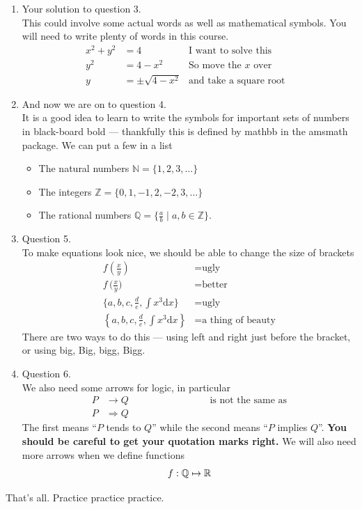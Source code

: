\documentclass[letterpaper,12pt]{article}
\begin{document}
\begin{enumerate}
 \item Your solution to question 3. \\
  This could involve some actual words as well as mathematical symbols. You
  will need to write plenty of words in this course.
  \begin{align}
    x^{2} + y^{2} &= 4      & \text{I want to solve this}& \\
    y^2 &= 4 - x^2          & \text{So move the $x$ over}& \\
    y &= \pm \sqrt{4 - x^2} & \text{and take a square root}&
  \end{align}

 \item And now we are on to question 4. \\
   It is a good idea to learn to write the symbols for important sets of numbers
   in black-board bold --- thankfully this is defined by mathbb in the amsmath
   package. We can put a few in a list
   \begin{itemize}
     \item The natural numbers $\mathbb{N} = \{1,2,3,\dots\}$
     \item The integers $\mathbb{Z} = \{0,1,-1,2,-2,3,\dots\}$
     \item The rational numbers $\mathbb{Q} = \big\{\frac{a}{b} \mid a,b \in
       \mathbb{Z}\big\}$.
   \end{itemize}

\item Question 5. \\
  To make equations look nice, we should be able to change the size of brackets
  \begin{align}
    f(\frac{x}{y}) &= \text{ugly} \\
    f\,\biggl(\frac{x}{y}\biggr) &= \text{better} \\
    \{a,b,c,\frac{d}{e}, \int x^3 \mathrm{d}x \} &= \text{ugly} \\
    \left\{a,b,c,\frac{d}{e}, \int x^3 \mathrm{d}x \right\} &= \text{a thing of beauty}
  \end{align}
  There are two ways to do this --- using left and right just before the
  bracket, or using big, Big, bigg, Bigg.

\item Question 6. \\
  We also need some arrows for logic, in particular
  \begin{align}
    P &\rightarrow Q \hspace{100pt}\text{is not the same as} \\
    P &\Rightarrow Q
  \end{align}
  The first means ``$P$ tends to $Q$'' while the second means ``$P$ implies $Q$''.
  \textbf{You should be careful to get your quotation marks right.} We will
  also need more arrows when we define functions \\
  \begin{equation}
    f: \mathbb{Q} \mapsto \mathbb{R} \\
  \end{equation}
\end{enumerate}
\hspace{20pt}That's all. Practice practice practice. \\

\end{document}
